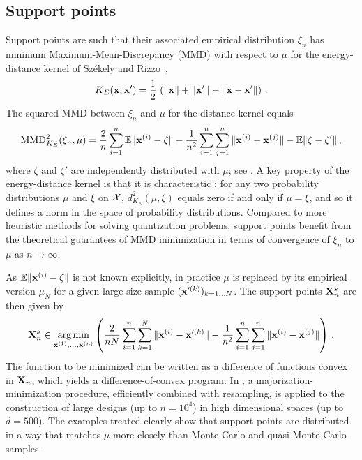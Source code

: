 \subsection{Support points}\label{sec:SP}
Support points \cite{mak_joseph_2018} are such that their associated empirical distribution $\xi_n$ has minimum Maximum-Mean-Discrepancy (MMD) with respect to $\mu$ for the energy-distance kernel of Sz\'ekely and Rizzo~\cite{szekely_rizzo_2013},
\begin{equation}\label{eq:kE}
K_E({\bf x},{\bf x}') = \frac12\, \left(\Vert {\bf x} \Vert + \Vert {\bf x}' \Vert - \Vert {\bf x}-{\bf x}' \Vert\right)\,.
\end{equation} 
The squared MMD between $\xi_n$ and $\mu$ for the distance kernel equals
\begin{equation}\label{eq:energySP}
\mathrm{MMD}_{K_E}^2(\xi_n,\mu) = \frac{2}{n} \sum_{i=1}^{n} \mathbb{E} \|{\bf x}^{(i)}-\zeta\| - \frac{1}{n^2} \sum_{i=1}^{n}\sum_{j=1}^{n} \|{\bf x}^{(i)}-{\bf x}^{(j)}\| - \mathbb{E} \|\zeta-\zeta'\| \,,
\end{equation}
where $\zeta$ and $\zeta'$ are independently distributed with $\mu$; see \cite{sejdinovic_2013}.
A key property of the energy-distance kernel is that it is characteristic \cite{sriperumbudur_2010}: for any two probability distributions $\mu$ and $\xi$ on $\mathcal{X}$, $d_{K_E}^2(\mu,\xi)$ equals zero if and only if $\mu=\xi$, and so it defines a norm in the space of probability distributions.
Compared to more heuristic methods for solving quantization problems, support points benefit from the theoretical guarantees of MMD minimization in terms of convergence of $\xi_n$ to $\mu$ as $n\to\infty$. 

As $\mathbb{E} \|{\bf x}^{(i)}-\zeta\|$ is not known explicitly, in practice $\mu$ is replaced by its empirical version $\mu_N$ for a given large-size sample $({\bf x}'^{(k)})_{k=1\ldots N}$. 
The support points ${\bf X}_n^s$ are then given by
\begin{equation}\label{eq:SPestim}
{\bf X}_n^s \in \operatorname*{arg\,min}_{{\bf x}^{(1)},\ldots,{\bf x}^{(n)}} \left( \frac{2}{n N} \sum_{i=1}^{n} \sum_{k=1}^N \|{\bf x}^{(i)}-{\bf x}'^{(k)}\| - \frac{1}{{n}^2} \sum_{i=1}^{n}\sum_{j=1}^{n} \|{\bf x}^{(i)}-{\bf x}^{(j)}\| \right) \,.
\end{equation}
The function to be minimized can be written as a difference of functions convex in ${\bf X}_n$, which yields a difference-of-convex program. 
In \cite{mak_joseph_2018}, a majorization-minimization procedure, efficiently combined with resampling, is applied to the construction of large designs (up to $n=10^4$) in high dimensional spaces (up to $d=500$). 
The examples treated clearly show that support points are distributed in a way that matches $\mu$ more closely than Monte-Carlo and quasi-Monte Carlo samples.

